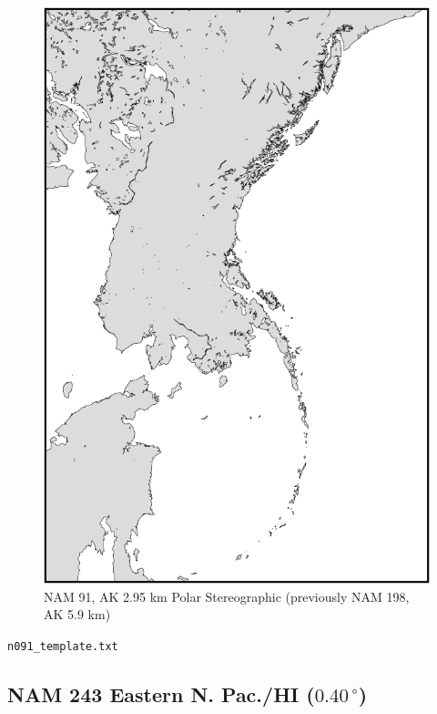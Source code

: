 \documentclass[11pt]{article}   %
\begin{document}
\begin{figure}[htbp]\begin{center}
 \includegraphics[angle=-90,scale=1.0]{Figs/n091.pdf}
\parbox{15cm}{\caption{\label{FigNAM198}
NAM 91, AK 2.95 km Polar Stereographic (previously NAM 198, AK 5.9 km)
}}
\end{center}\end{figure}
\clearpage
\verb|n091_template.txt| \\
\tiny  \normalsize


\clearpage
\subsection{NAM 243 Eastern N. Pac./HI ($0.40  \, ^{\circ}$)}
\end{document}
